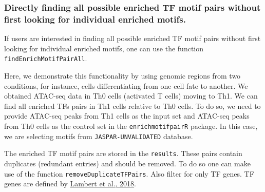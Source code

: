 \documentclass[
]{article}
\newenvironment{Shaded}{}{}
\newcommand{\AttributeTok}[1]{\textcolor[rgb]{0.49,0.56,0.16}{#1}}
\newcommand{\CommentTok}[1]{\textcolor[rgb]{0.38,0.63,0.69}{\textit{#1}}}
\newcommand{\ConstantTok}[1]{\textcolor[rgb]{0.53,0.00,0.00}{#1}}
\newcommand{\FloatTok}[1]{\textcolor[rgb]{0.25,0.63,0.44}{#1}}
\newcommand{\FunctionTok}[1]{\textcolor[rgb]{0.02,0.16,0.49}{#1}}
\newcommand{\NormalTok}[1]{#1}
\newcommand{\OtherTok}[1]{\textcolor[rgb]{0.00,0.44,0.13}{#1}}
\newcommand{\SpecialCharTok}[1]{\textcolor[rgb]{0.25,0.44,0.63}{#1}}
\newcommand{\StringTok}[1]{\textcolor[rgb]{0.25,0.44,0.63}{#1}}
\begin{document}
\hypertarget{directly-finding-all-possible-enriched-tf-motif-pairs-without-first-looking-for-individual-enriched-motifs.}{%
\subsubsection{Directly finding all possible enriched TF motif pairs
without first looking for individual enriched
motifs.}\label{directly-finding-all-possible-enriched-tf-motif-pairs-without-first-looking-for-individual-enriched-motifs.}}

If users are interested in finding all possible enriched TF motif pairs
without first looking for individual enriched motifs, one can use the
function \texttt{findEnrichMotifPairAll}.

Here, we demonstrate this functionality by using genomic regions from
two conditions, for instance, cells differentiating from one cell fate
to another. We obtained ATAC-seq data in Th0 cells (activated T cells)
moving to Th1. We can find all enriched TFs pairs in Th1 cells relative
to Th0 cells. To do so, we need to provide ATAC-seq peaks from Th1 cells
as the input set and ATAC-seq peaks from Th0 cells as the control set in
the \texttt{enrichmotifpairR} package. In this case, we are selecting
motifs from \texttt{JASPAR-UNVALIDATED} database.

\begin{Shaded}
\end{Shaded}

The enriched TF motif pairs are stored in the \texttt{results}. These
pairs contain duplicates (redundant entries) and should be removed. To
do so one can make use of the function \texttt{removeDuplicateTFPairs}.
Also filter for only TF genes. TF genes are defined by
\href{https://pubmed.ncbi.nlm.nih.gov/29425488/}{Lambert et al., 2018}.
\end{document}
